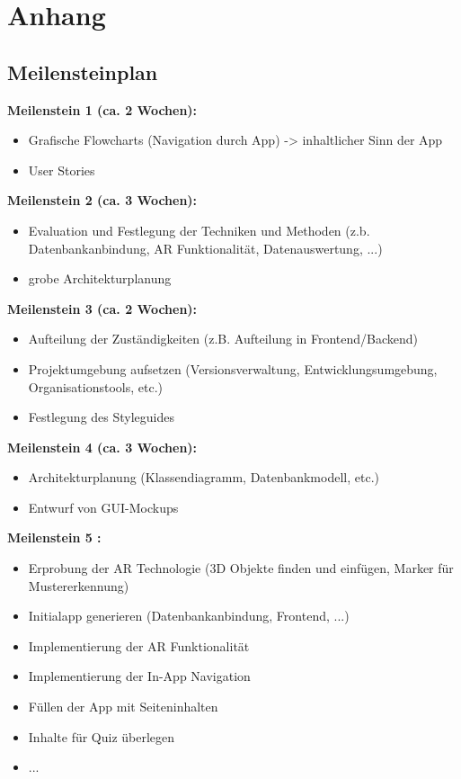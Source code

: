 \chapter{Anhang}\label{app:anhang}
\section{Meilensteinplan}\label{Meilensteinplan}

\textbf{Meilenstein 1  (ca. 2 Wochen):}
\begin{itemize}
\item Grafische Flowcharts (Navigation durch App) -> inhaltlicher Sinn der App
\item User Stories
\end{itemize}

\textbf{Meilenstein 2  (ca. 3 Wochen):}
\begin{itemize}
\item Evaluation und Festlegung der Techniken und Methoden (z.b. Datenbankanbindung, AR Funktionalität, Datenauswertung, ...)
\item grobe Architekturplanung
\end{itemize}

\textbf{Meilenstein 3  (ca. 2 Wochen):}
\begin{itemize}
\item Aufteilung der Zuständigkeiten (z.B. Aufteilung in Frontend/Backend)
\item Projektumgebung aufsetzen (Versionsverwaltung, Entwicklungsumgebung, Organisationstools, etc.)
\item Festlegung des Styleguides
\end{itemize}

\textbf{Meilenstein 4  (ca. 3 Wochen):}
\begin{itemize}
\item Architekturplanung (Klassendiagramm, Datenbankmodell, etc.)
\item Entwurf von GUI-Mockups
\end{itemize}

\textbf{Meilenstein 5 :}
\begin{itemize}
\item Erprobung der AR Technologie (3D Objekte finden und einfügen, Marker für Mustererkennung)
\item Initialapp generieren (Datenbankanbindung, Frontend, ...)
\item Implementierung der AR Funktionalität
\item Implementierung der In-App Navigation
\item Füllen der App mit Seiteninhalten
\item Inhalte für Quiz überlegen
\item ...
\end{itemize}

